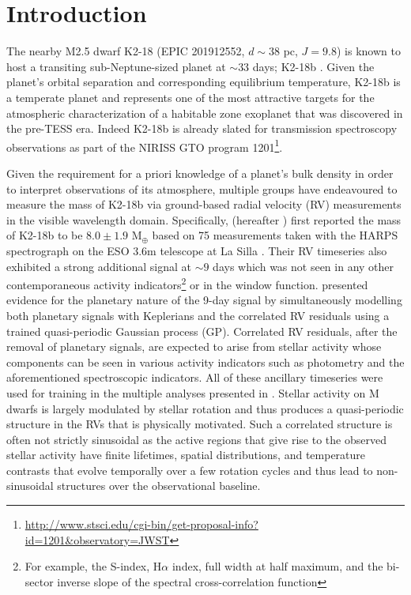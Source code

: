 \section{Introduction}
The nearby M2.5 dwarf K2-18 (EPIC 201912552, $d\sim 38$ pc, $J=9.8$)
is known to host a transiting sub-Neptune-sized planet 
at $\sim 33$ days; K2-18b \citep{foremanmackey15b,montet15,benneke17}. Given the planet's orbital separation
and corresponding equilibrium temperature, K2-18b is a temperate planet and represents one of the
most attractive targets for the atmospheric characterization of a habitable zone exoplanet 
that was discovered in the pre-TESS era. Indeed K2-18b is already slated for transmission
spectroscopy observations as part of the NIRISS GTO program
1201\footnote{\url{http://www.stsci.edu/cgi-bin/get-proposal-info?id=1201&observatory=JWST}}.

Given the requirement for a priori knowledge of a planet's bulk density in order to interpret
observations of its atmosphere, multiple groups have endeavoured to
measure the mass of K2-18b via ground-based radial velocity (RV) measurements in the visible
wavelength domain. Specifically, \cite{cloutier17b} (hereafter )
first reported the mass of K2-18b to be
$8.0\pm 1.9$ M$_{\oplus}$ based on 75 measurements taken with the HARPS spectrograph on the ESO 3.6m
telescope at La Silla  \citep{mayor03}. 
Their RV timeseries also exhibited a strong additional signal
at $\sim 9$ days which was not seen in any other contemporaneous activity indicators\footnote{For example,  the
  S-index, H$\alpha$ index, full width at half maximum, and the bi-sector inverse slope of the spectral
  cross-correlation function} or in the window function.
 presented evidence for the
planetary nature of the 9-day signal by simultaneously modelling both planetary signals with Keplerians
and the correlated RV residuals using a trained quasi-periodic Gaussian process (GP).
Correlated RV residuals, after the removal of planetary signals, are expected to arise from
stellar activity whose components can be seen in various activity indicators such as
photometry and the aforementioned spectroscopic indicators. All of these ancillary timeseries were used
for training in the multiple analyses presented in .
Stellar activity on M dwarfs is largely modulated by stellar rotation \citep{boisse11}
and thus produces a quasi-periodic structure in the RVs that is physically motivated.
Such a correlated structure is often not strictly sinusoidal as the
active regions that give rise to the observed stellar activity have finite lifetimes, spatial
distributions, and temperature contrasts that evolve temporally over a
few rotation cycles and thus lead to non-sinusoidal structures over the observational baseline.

